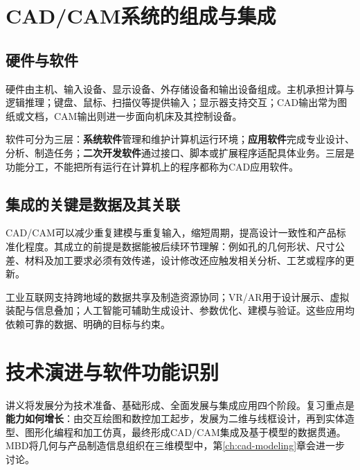 
\section{CAD/CAM系统的组成与集成}
\subsection{硬件与软件}
硬件由主机、输入设备、显示设备、外存储设备和输出设备组成。主机承担计算与逻辑推理；键盘、鼠标、扫描仪等提供输入；显示器支持交互；CAD输出常为图纸或文档，CAM输出则进一步面向机床及其控制设备。

软件可分为三层：\textbf{系统软件}管理和维护计算机运行环境；\textbf{应用软件}完成专业设计、分析、制造任务；\textbf{二次开发软件}通过接口、脚本或扩展程序适配具体业务。三层是功能分工，不能把所有运行在计算机上的程序都称为CAD应用软件。

\subsection{集成的关键是数据及其关联}
CAD/CAM可以减少重复建模与重复输入，缩短周期，提高设计一致性和产品标准化程度。其成立的前提是数据能被后续环节理解：例如孔的几何形状、尺寸公差、材料及加工要求必须有效传递，设计修改还应触发相关分析、工艺或程序的更新。


工业互联网支持跨地域的数据共享及制造资源协同；VR/AR用于设计展示、虚拟装配与信息叠加；人工智能可辅助生成设计、参数优化、建模与验证。这些应用均依赖可靠的数据、明确的目标与约束。

\section{技术演进与软件功能识别}
讲义将发展分为技术准备、基础形成、全面发展与集成应用四个阶段。复习重点是\textbf{能力如何增长}：由交互绘图和数控加工起步，发展为二维与线框设计，再到实体造型、图形化编程和加工仿真，最终形成CAD/CAM集成及基于模型的数据贯通。MBD将几何与产品制造信息组织在三维模型中，第\ref{ch:cad-modeling}章会进一步讨论。

